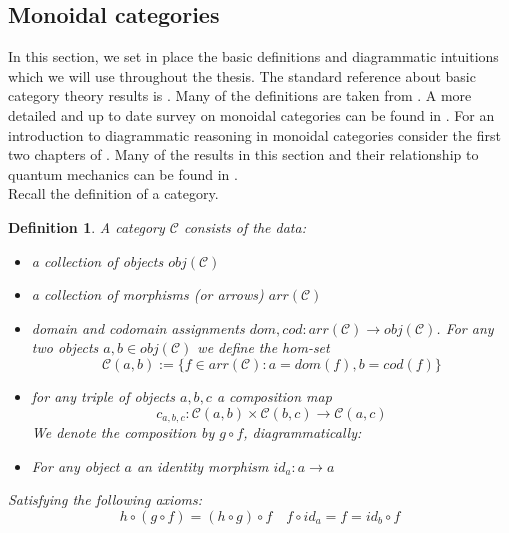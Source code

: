 \documentclass{article}
\newtheorem{definition}{Definition}
\newcommand{\cat}{\mathcal{C}}
\begin{document}
\subsection{Monoidal categories}
In this section, we set in place the basic definitions and diagrammatic  intuitions which we will use throughout the thesis. The standard reference about basic category theory results is \cite{MacLane71}. Many of the definitions are taken from \cite{Abramsky11}. A more detailed and up to date survey on monoidal categories can be found in \cite{Etingof15}. For an introduction to diagrammatic reasoning in monoidal categories consider the first two chapters of \cite{Coecke17}. Many of the results in this section and their relationship to quantum mechanics can be found in \cite{Vicary12}. \\
Recall the definition of a category.
\begin{definition}
	A category $\cat$ consists of the data:
	\begin{itemize}
		\item a collection of objects $obj(\cat)$ 
		\item a collection of morphisms (or arrows) $arr(\cat)$
		\item domain and codomain assignments $dom, cod: arr(\cat) \rightarrow obj(\cat)$. For any two objects $a,b \in obj(\cat)$ we define the hom-set 
		$$ \cat (a,b) := \{ f \in arr(\cat) : a= dom(f), b=cod(f) \}$$
		\item for any triple of objects $a,b,c$ a composition map 
		$$c_{a,b,c}: \cat (a,b) \times \cat (b,c) \rightarrow \cat (a,c)$$
		We denote the composition by $g \circ f$, diagrammatically:
		\begin{center}
		\end{center}
		\item For any object $a$ an identity morphism $id_a: a \rightarrow a$ 
	\end{itemize}
	Satisfying the following axioms:
	\begin{equation*}
	h \circ (g \circ f) = (h \circ g) \circ f \quad f \circ id_a = f = id_b \circ f
	\end{equation*}
	
\end{definition}
\end{document}

